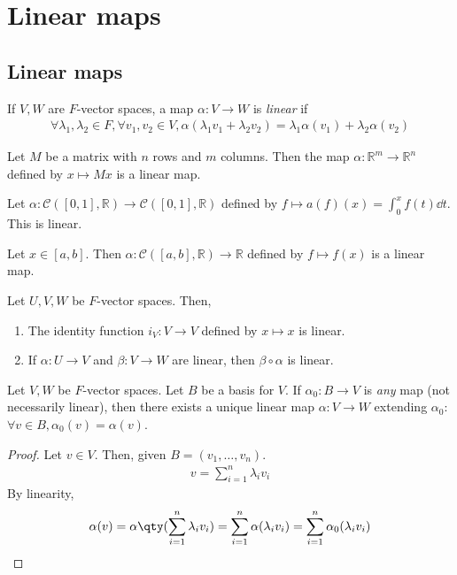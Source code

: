 \section{Linear maps}
\subsection{Linear maps}
\begin{definition}
    If $V, W$ are $F$-vector spaces, a map $\alpha \colon V \to W$ is \textit{linear} if
    \begin{align*}
        \forall \lambda_1, \lambda_2 \in F, \forall v_1, v_2 \in V, \alpha(\lambda_1 v_1 + \lambda_2 v_2) = \lambda_1 \alpha(v_1) + \lambda_2 \alpha(v_2)
    \end{align*}
\end{definition}
\begin{example}
    Let $M$ be a matrix with $n$ rows and $m$ columns.
    Then the map $\alpha \colon \mathbb R^m \to \mathbb R^n$ defined by $x \mapsto M x$ is a linear map.
\end{example}
\begin{example}
    Let $\alpha \colon \mathcal C([0,1], \mathbb R) \to \mathcal C([0,1], \mathbb R)$ defined by $f \mapsto a(f)(x) = \int_0^x f(t) \dd{t}$.
    This is linear.
\end{example}
\begin{example}
    Let $x \in [a,b]$.
    Then $\alpha \colon \mathcal C([a,b], \mathbb R) \to \mathbb R$ defined by $f \mapsto f(x)$ is a linear map.
\end{example}
\begin{remark}
    Let $U, V, W$ be $F$-vector spaces.
    Then,
    \begin{enumerate}
        \item The identity function $i_V \colon V \to V$ defined by $x \mapsto x$ is linear.
        \item If $\alpha \colon U \to V$ and $\beta \colon V \to W$ are linear, then $\beta \circ \alpha$ is linear.
    \end{enumerate}
\end{remark}
\begin{lemma}
    Let $V, W$ be $F$-vector spaces.
    Let $B$ be a basis for $V$.
    If $\alpha_0 \colon B \to V$ is \textit{any} map (not necessarily linear), then there exists a unique linear map $\alpha \colon V \to W$ extending $\alpha_0$: $\forall v \in B, \alpha_0(v) = \alpha(v)$.
\end{lemma}
\begin{proof}
    Let $v \in V$.
    Then, given $B = (v_1, \dots, v_n)$.
    \begin{align*}
        v = \sum_{i=1}^n \lambda_i v_i
    \end{align*}
    By linearity,
    \begin{align*}
        \alpha(v) = \alpha\qty(\sum_{i=1}^n \lambda_i v_i) = \sum_{i=1}^n \alpha(\lambda_i v_i) = \sum_{i=1}^n \alpha_0(\lambda_i v_i)
    \end{align*}
\end{proof}

